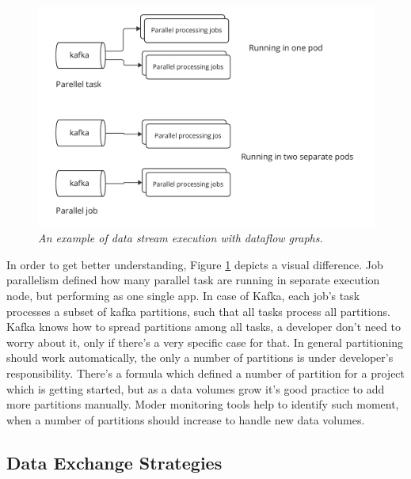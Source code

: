 \begin{figure}[H]
    \centering
    \includegraphics[width=1\textwidth]{figures/parallel-jobs}
    \caption{\textit{An example of data stream execution with dataflow graphs.}}
    \label{fig:parallel-job}
\end{figure}

In order to get better understanding, Figure \ref{fig:parallel-job} depicts a visual difference.
Job parallelism defined how many parallel task are running in separate execution node,
but performing as one single app.
In case of Kafka, each job's task processes a subset of kafka partitions, such
that all tasks process all partitions.
Kafka knows how to spread partitions among all tasks, a developer
don't need to worry about it, only if there's a very specific case for that.
In general partitioning should work automatically, the only a number of partitions
is under developer's responsibility.
There's a formula which defined a number of partition for a project which is getting started,
but as a data volumes grow it's good practice to add more partitions manually.
Moder monitoring tools help to identify such moment, when a number of partitions
should increase to handle new data volumes.

\subsection{Data Exchange Strategies}\label{subsec:data-exchange-strategies}

